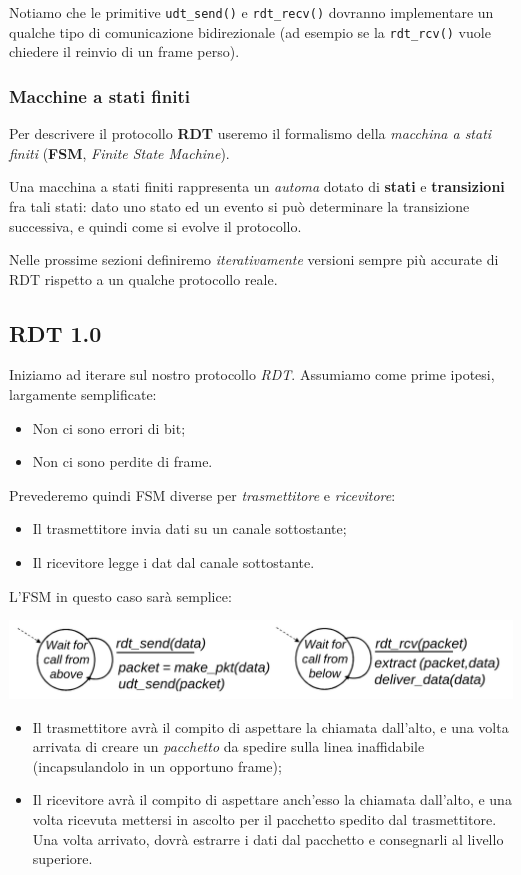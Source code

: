 \documentclass[a4paper,11pt]{article}
\begin{document}
Notiamo che le primitive \lstinline|udt_send()| e \lstinline|rdt_recv()| dovranno implementare un qualche tipo di comunicazione bidirezionale (ad esempio se la \lstinline|rdt_rcv()| vuole chiedere il reinvio di un frame perso).

\subsubsection{Macchine a stati finiti}
Per descrivere il protocollo \textbf{RDT} useremo il formalismo della \textit{macchina a stati finiti} (\textbf{FSM}, \textit{Finite State Machine}).

Una macchina a stati finiti rappresenta un \textit{automa} dotato di \textbf{stati} e \textbf{transizioni} fra tali stati: dato uno stato ed un evento si può determinare la transizione successiva, e quindi come si evolve il protocollo. 

\par\smallskip

Nelle prossime sezioni definiremo \textit{iterativamente} versioni sempre più accurate di RDT rispetto a un qualche protocollo reale.

\subsection{RDT 1.0}
Iniziamo ad iterare sul nostro protocollo \textit{RDT}.
Assumiamo come prime ipotesi, largamente semplificate:
\begin{itemize}
	\item Non ci sono errori di bit;
	\item Non ci sono perdite di frame.
\end{itemize}

Prevederemo quindi FSM diverse per \textit{trasmettitore} e \textit{ricevitore}:
\begin{itemize}
	\item Il trasmettitore invia dati su un canale sottostante;
	\item Il ricevitore legge i dat dal canale sottostante.
\end{itemize}

L'FSM in questo caso sarà semplice:
\begin{center}
	\includegraphics[scale=0.16]{../figures/rdt1fsm.png}
\end{center}
\begin{itemize}
	\item Il trasmettitore avrà il compito di aspettare la chiamata dall'alto, e una volta arrivata di creare un \textit{pacchetto} da spedire sulla linea inaffidabile (incapsulandolo in un opportuno frame);
	\item Il ricevitore avrà il compito di aspettare anch'esso la chiamata dall'alto, e una volta ricevuta mettersi in ascolto per il pacchetto spedito dal trasmettitore. Una volta arrivato, dovrà estrarre i dati dal pacchetto e consegnarli al livello superiore.
\end{itemize}
\end{document}
